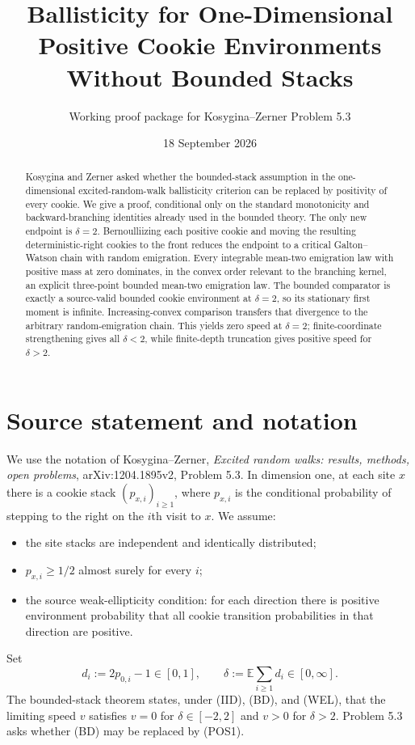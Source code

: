\documentclass[11pt]{article}
\title{Ballisticity for One-Dimensional Positive Cookie Environments Without Bounded Stacks}
\author{Working proof package for Kosygina--Zerner Problem 5.3}
\date{18 September 2026}
\newcommand{\E}{\mathbb E}
\begin{document}
\maketitle

\begin{abstract}
Kosygina and Zerner asked whether the bounded-stack assumption in the one-dimensional excited-random-walk ballisticity criterion can be replaced by positivity of every cookie.  We give a proof, conditional only on the standard monotonicity and backward-branching identities already used in the bounded theory.  The only new endpoint is $\delta=2$.  Bernoulliizing each positive cookie and moving the resulting deterministic-right cookies to the front reduces the endpoint to a critical Galton--Watson chain with random emigration.  Every integrable mean-two emigration law with positive mass at zero dominates, in the convex order relevant to the branching kernel, an explicit three-point bounded mean-two emigration law.  The bounded comparator is exactly a source-valid bounded cookie environment at $\delta=2$, so its stationary first moment is infinite.  Increasing-convex comparison transfers that divergence to the arbitrary random-emigration chain.  This yields zero speed at $\delta=2$; finite-coordinate strengthening gives all $\delta<2$, while finite-depth truncation gives positive speed for $\delta>2$.
\end{abstract}

\section{Source statement and notation}

We use the notation of Kosygina--Zerner, \emph{Excited random walks: results, methods, open problems}, arXiv:1204.1895v2, Problem 5.3.  In dimension one, at each site $x$ there is a cookie stack $(p_{x,i})_{i\ge1}$, where $p_{x,i}$ is the conditional probability of stepping to the right on the $i$th visit to $x$.  We assume:
\begin{itemize}
\item[(IID)] the site stacks are independent and identically distributed;
\item[(POS1)] $p_{x,i}\ge1/2$ almost surely for every $i$;
\item[(WEL)] the source weak-ellipticity condition: for each direction there is positive environment probability that all cookie transition probabilities in that direction are positive.
\end{itemize}
Set
\[
 d_i:=2p_{0,i}-1\in[0,1],
 \qquad
 \delta:=\E\sum_{i\ge1}d_i\in[0,\infty].
\]
The bounded-stack theorem states, under (IID), (BD), and (WEL), that the limiting speed $v$ satisfies $v=0$ for $\delta\in[-2,2]$ and $v>0$ for $\delta>2$.  Problem 5.3 asks whether (BD) may be replaced by (POS1).
\end{document}
